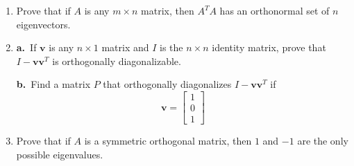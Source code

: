 \documentclass{article}
\theoremstyle{mystyle}
\begin{document}
\begin{enumerate}
\noindent\textit{\textbf{Working with Proofs}}

\item[25.] Prove that if $A$ is any $m\times n$ matrix, then $A^T A$ has an orthonormal
set of $n$ eigenvectors.

\item[28.]
\textbf{a.}\ If $\mathbf{v}$ is any $n\times 1$ matrix and $I$ is the $n\times n$
identity matrix, prove that $I - \mathbf{v}\mathbf{v}^T$ is orthogonally diagonalizable.

\textbf{b.}\ Find a matrix $P$ that orthogonally diagonalizes $I - \mathbf{v}\mathbf{v}^T$ if
\[
  \mathbf{v} = \begin{bmatrix}1\\0\\1\end{bmatrix}
\]

\item[29.] Prove that if $A$ is a symmetric orthogonal matrix, then $1$ and $-1$ are
the only possible eigenvalues.

\end{enumerate}
\end{document}
